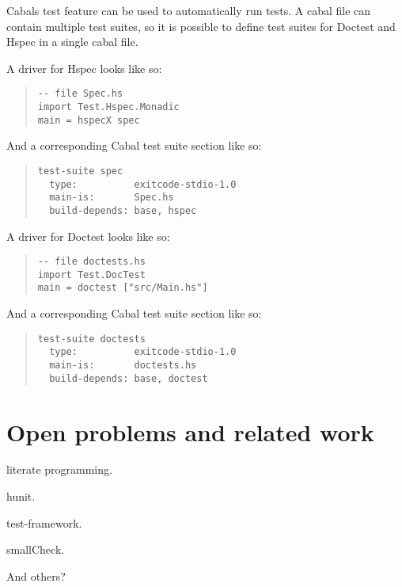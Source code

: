 \documentclass[preprint]{sigplanconf}
\newcommand{\hspec}{Hspec}
\begin{document}
\noindent Cabals test feature can be used to automatically run tests.  A cabal
file can contain multiple test suites, so it is possible to define test suites
for Doctest and \hspec{} in a single cabal file.

A driver for Hspec looks like so:

\begin{quote}
\small
\begin{verbatim}
-- file Spec.hs
import Test.Hspec.Monadic
main = hspecX spec
\end{verbatim}
\end{quote}

\noindent And a corresponding Cabal test suite section like so:

\begin{quote}
\small
\begin{verbatim}
test-suite spec
  type:          exitcode-stdio-1.0
  main-is:       Spec.hs
  build-depends: base, hspec
\end{verbatim}
\end{quote}

\noindent A driver for Doctest looks like so:

\begin{quote}
\small
\begin{verbatim}
-- file doctests.hs
import Test.DocTest
main = doctest ["src/Main.hs"]
\end{verbatim}
\end{quote}

\noindent And a corresponding Cabal test suite section like so:

\begin{quote}
\small
\begin{verbatim}
test-suite doctests
  type:          exitcode-stdio-1.0
  main-is:       doctests.hs
  build-depends: base, doctest
\end{verbatim}
\end{quote}

\section{Open problems and related work}

literate programming.

hunit.

test-framework.

smallCheck.

And others?
\end{document}
